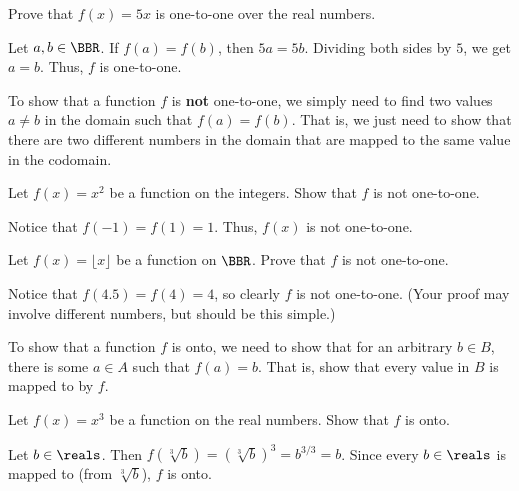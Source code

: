 \begin{exer}
Prove that $f(x)=5x$ is one-to-one over the real numbers.

\noindent
\pflinethree
\begin{answer}
Let $a,b\in \BBR$.  If $f(a)=f(b)$, then $5a=5b$.  Dividing both sides by $5$, we get $a=b$.
Thus, $f$ is one-to-one.
\end{answer}
\end{exer}

\begin{proc}
To show that a function $f$ is {\bf not} one-to-one, we simply need to find two values $a\neq b$ in the
domain such that $f(a)=f(b)$. That is, we just need to show that there are two different numbers in the domain
that are mapped to the same value in the codomain.
\end{proc}

\begin{exa}\label{exa:xsquarenotoneone}
Let $f(x)=x^2$ be a function on the integers.  Show that $f$ is not one-to-one.
\begin{sol}
Notice that $f(-1)=f(1)=1$.  Thus, $f(x)$ is not one-to-one.
\end{sol}
\end{exa}

\begin{exer}
Let $f(x)=\lfloor x \rfloor$ be a function on $\BBR$.  Prove that $f$ is not one-to-one.

\noindent
\pflinetwo
\begin{answer}
Notice that $f(4.5)=f(4)=4$, so clearly $f$ is not one-to-one.
(Your proof may involve different numbers, but should be this simple.)
\end{answer}
\end{exer}

\begin{proc}
To show that a function $f$ is onto, we need to show that for an arbitrary $b\in B$, there is some
$a\in A$ such that $f(a)=b$.  That is, show that every value in $B$ is mapped to by $f$.
\end{proc}

\begin{exa}
Let $f(x)=x^3$ be a function on the real numbers.  Show that $f$ is onto.
\begin{sol}
Let $b\in \reals$.  
Then $f\left(\sqrt[3]{b}\right)=\left(\sqrt[3]{b}\right)^3 = b^{3/3}=b$.  
Since every $b\in\reals$ is mapped to (from $\sqrt[3]{b}$), $f$ is onto.
\end{sol}
\end{exa}

